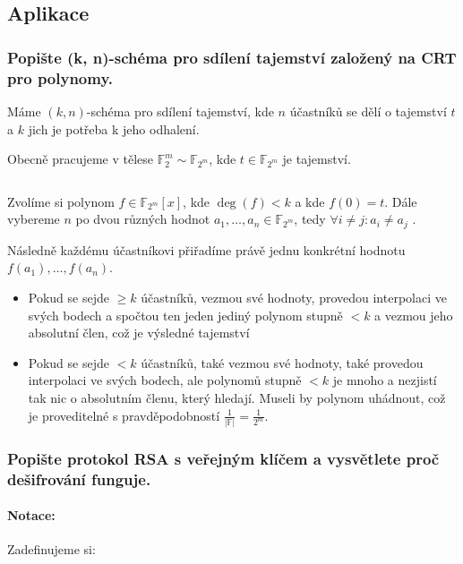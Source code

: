 \documentclass[10pt,a4paper]{article}
\newcommand{\F}{{\mathbb{F}}}       %
\begin{document}
\newpage 


\subsection{Aplikace}

\subsubsection{Popište (k, n)-schéma pro sdílení tajemství založený na CRT pro polynomy.}

Máme $(k,n)$-schéma pro sdílení tajemství, kde $n$ účastníků se dělí o tajemství $t$ a $k$ jich je potřeba k jeho odhalení.

Obecně pracujeme v tělese $\F_2^m \sim \F_{2^m}$, kde $t \in \F_{2^m}$ je tajemství.

$ $

Zvolíme si polynom $f\in \F_{2^m}[x]$, kde $\deg(f) < k$ a kde $f(0)=t$.
Dále vybereme $n$ po dvou různých hodnot $a_1, \dots, a_n \in \F_{2^m}$, tedy $\forall i\neq j: a_i \neq a_j$ .

Následně každému účastníkovi přiřadíme právě jednu konkrétní hodnotu $f(a_1), \dots, f(a_n)$.

\begin{itemize}
    \item Pokud se sejde $\geq k$ účastníků, vezmou své hodnoty, provedou interpolaci ve svých bodech a spočtou ten jeden jediný polynom stupně $<k$ a vezmou jeho absolutní člen, což je výsledné tajemství
    \item Pokud se sejde $< k$ účastníků, také vezmou své hodnoty, také provedou interpolaci ve svých bodech, ale polynomů stupně $<k$ je mnoho a nezjistí tak nic o absolutním členu, který hledají. 
    Museli by polynom uhádnout, což je proveditelné s pravděpodobností $\frac{1}{|\F|} = \frac{1}{2^m}$.
\end{itemize}

\subsubsection{Popište protokol RSA s veřejným klíčem a vysvětlete proč dešifrování funguje.}
\paragraph*{Notace:}
Zadefinujeme si:
\end{document}
